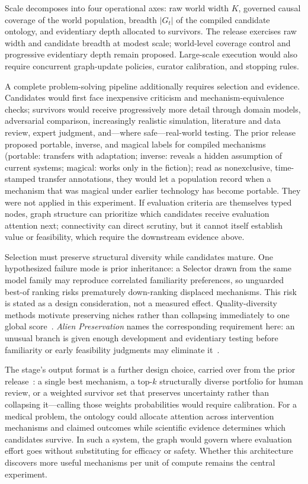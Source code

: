 \documentclass[11pt,a4paper]{article}
\begin{document}
Scale decomposes into four operational axes: raw world width $K$, governed causal coverage of the world population, breadth $|G_t|$ of the compiled candidate ontology, and evidentiary depth allocated to survivors. The release exercises raw width and candidate breadth at modest scale; world-level coverage control and progressive evidentiary depth remain proposed. Large-scale execution would also require concurrent graph-update policies, curator calibration, and stopping rules.

A complete problem-solving pipeline additionally requires selection and evidence. Candidates would first face inexpensive criticism and mechanism-equivalence checks; survivors would receive progressively more detail through domain models, adversarial comparison, increasingly realistic simulation, literature and data review, expert judgment, and---where safe---real-world testing. The prior release proposed portable, inverse, and magical labels for compiled mechanisms~\cite{westerberg2025strangeworlds} (portable: transfers with adaptation; inverse: reveals a hidden assumption of current systems; magical: works only in the fiction); read as nonexclusive, time-stamped transfer annotations, they would let a population record when a mechanism that was magical under earlier technology has become portable. They were not applied in this experiment. If evaluation criteria are themselves typed nodes, graph structure can prioritize which candidates receive evaluation attention next; connectivity can direct scrutiny, but it cannot itself establish value or feasibility, which require the downstream evidence above.

Selection must preserve structural diversity while candidates mature. One hypothesized failure mode is prior inheritance: a Selector drawn from the same model family may reproduce correlated familiarity preferences, so unguarded best-of ranking risks prematurely down-ranking displaced mechanisms. This risk is stated as a design consideration, not a measured effect. Quality-diversity methods motivate preserving niches rather than collapsing immediately to one global score~\cite{lehman2011novelty,mouret2015mapelites,bradley2024qdaif}. \emph{Alien Preservation} names the corresponding requirement here: an unusual branch is given enough development and evidentiary testing before familiarity or early feasibility judgments may eliminate it~\cite{westerberg2025strangeworlds}.

The stage's output format is a further design choice, carried over from the prior release~\cite{westerberg2025strangeworlds}: a single best mechanism, a top-$k$ structurally diverse portfolio for human review, or a weighted survivor set that preserves uncertainty rather than collapsing it---calling those weights probabilities would require calibration. For a medical problem, the ontology could allocate attention across intervention mechanisms and claimed outcomes while scientific evidence determines which candidates survive. In such a system, the graph would govern where evaluation effort goes without substituting for efficacy or safety. Whether this architecture discovers more useful mechanisms per unit of compute remains the central experiment.
\end{document}
